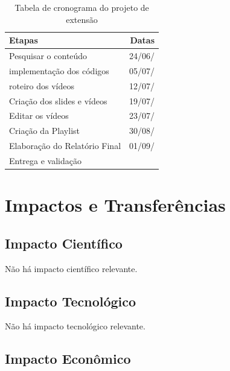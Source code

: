 \documentclass[a4paper,10pt]{article} %
\begin{document}
\begin{table}[ht] %
\begin{center}
 \caption{Tabela de cronograma do projeto de extensão}
\begin{tabular}{|l|r|}
  \hline \hline
  \textbf{Etapas} & \textbf{Datas} \\ \hline \hline
   Pesquisar o conteúdo & 24/06/ \\ \hline
   implementação dos códigos & 05/07/ \\ \hline
   roteiro dos vídeos & 12/07/ \\ \hline
   Criação dos slides e vídeos  & 19/07/ \\ \hline
   Editar os vídeos  & 23/07/ \\ \hline
   Criação da Playlist  & 30/08/ \\ \hline
   Elaboração do Relatório Final  & 01/09/ \\ \hline
   Entrega e validação &  \\ \hline \hline
\end{tabular} 
\label{tab:resultados}
\end{center}
\end{table}






\section{Impactos e Transferências}

\subsection{Impacto Científico}

Não há impacto científico relevante.

\subsection{Impacto Tecnológico}

Não há impacto tecnológico relevante.

\subsection{Impacto Econômico}
\end{document}
